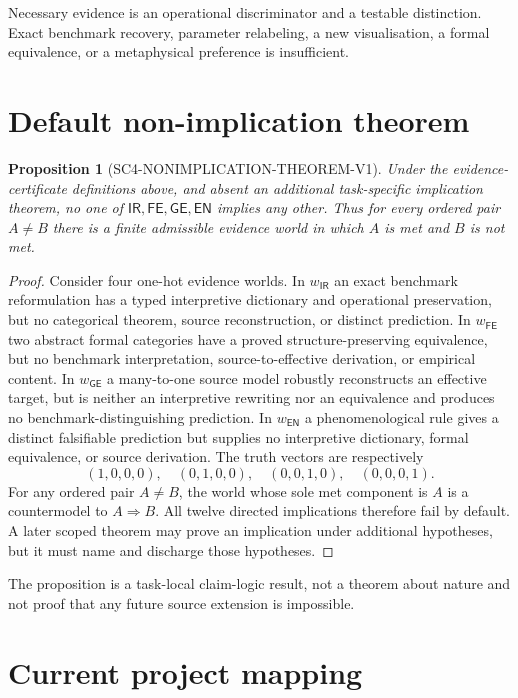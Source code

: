 \documentclass[11pt]{article}
\newtheorem{proposition}{Proposition}
\newcommand{\IR}{\mathsf{IR}}
\newcommand{\FE}{\mathsf{FE}}
\newcommand{\GE}{\mathsf{GE}}
\newcommand{\EN}{\mathsf{EN}}
\begin{document}
Necessary evidence is an operational discriminator and a testable distinction.
Exact benchmark recovery, parameter relabeling, a new visualisation, a formal
equivalence, or a metaphysical preference is insufficient.

\section{Default non-implication theorem}

\begin{proposition}[SC4-NONIMPLICATION-THEOREM-V1]
Under the evidence-certificate definitions above, and absent an additional
task-specific implication theorem, no one of $\IR,\FE,\GE,\EN$ implies any
other.  Thus for every ordered pair $A\ne B$ there is a finite admissible
evidence world in which $A$ is met and $B$ is not met.
\end{proposition}

\begin{proof}
Consider four one-hot evidence worlds.  In $w_{\IR}$ an exact benchmark
reformulation has a typed interpretive dictionary and operational preservation,
but no categorical theorem, source reconstruction, or distinct prediction.
In $w_{\FE}$ two abstract formal categories have a proved structure-preserving
equivalence, but no benchmark interpretation, source-to-effective derivation,
or empirical content.  In $w_{\GE}$ a many-to-one source model robustly
reconstructs an effective target, but is neither an interpretive rewriting nor
an equivalence and produces no benchmark-distinguishing prediction.  In
$w_{\EN}$ a phenomenological rule gives a distinct falsifiable prediction but
supplies no interpretive dictionary, formal equivalence, or source derivation.
The truth vectors are respectively
\[
 (1,0,0,0),\quad(0,1,0,0),\quad(0,0,1,0),\quad(0,0,0,1).
\]
For any ordered pair $A\ne B$, the world whose sole met component is $A$
is a countermodel to $A\Rightarrow B$.  All twelve directed implications
therefore fail by default.  A later scoped theorem may prove an implication
under additional hypotheses, but it must name and discharge those hypotheses.
\end{proof}

The proposition is a task-local claim-logic result, not a theorem about nature
and not proof that any future source extension is impossible.

\section{Current project mapping}
\end{document}
